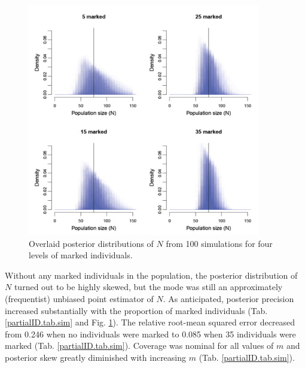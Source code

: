 
\begin{figure}[ht]
  \centering
  \includegraphics[width=4in,height=4in]{Ch19-PartialID/figs/Nposts2.png}
  \caption{Overlaid posterior distributions of $N$ from 100 simulations
    for four levels of marked individuals.}
  \label{partialID.fig.nposts}
\end{figure}

Without any marked individuals in the population, the posterior
distribution of $N$ turned out to be highly skewed, but the mode was
still an approximately (frequentist) unbiased point estimator of
$N$. As anticipated, posterior precision increased substantially with
the proportion of marked individuals (Tab. \ref{partialID.tab.sim} and
Fig. \ref{partialID.fig.nposts}). The relative root-mean squared
error decreased from 0.246 when no individuals were marked to 0.085
when 35 individuals were marked
(Tab. \ref{partialID.tab.sim}). Coverage was nominal for all values of
$m$ and posterior skew greatly diminished with increasing $m$ (Tab. \ref{partialID.tab.sim}).

